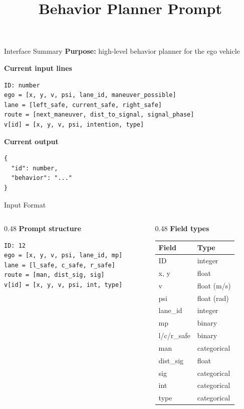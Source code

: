 \documentclass[aspectratio=169]{beamer}
\title{Behavior Planner Prompt}
\author{}
\date{}
\begin{document}
\begin{frame}
    \titlepage
\end{frame}

\begin{frame}[fragile]{Interface Summary}
\textbf{Purpose:} high-level behavior planner for the ego vehicle

\vspace{0.4em}
\textbf{Current input lines}
\begin{lstlisting}[style=codestyle]
ID: number
ego = [x, y, v, psi, lane_id, maneuver_possible]
lane = [left_safe, current_safe, right_safe]
route = [next_maneuver, dist_to_signal, signal_phase]
v[id] = [x, y, v, psi, intention, type]
\end{lstlisting}

\textbf{Current output}
\begin{lstlisting}[style=codestyle]
{
  "id": number,
  "behavior": "..."
}
\end{lstlisting}
\end{frame}

\begin{frame}[fragile]{Input Format}
\begin{columns}[T]
    \begin{column}{0.48\textwidth}
        \textbf{Prompt structure}
        \begin{lstlisting}[style=codestyle]
ID: 12
ego = [x, y, v, psi, lane_id, mp]
lane = [l_safe, c_safe, r_safe]
route = [man, dist_sig, sig]
v[id] = [x, y, v, psi, int, type]
        \end{lstlisting}
    \end{column}
    \begin{column}{0.48\textwidth}
        \textbf{Field types}
        \begin{tabular}{>{\ttfamily}p{}p{}}
            \toprule
            Field & Type \\
            \midrule
            ID & integer \\
            x, y & float \\
            v & float (m/s) \\
            psi & float (rad) \\
            lane\_id & integer \\
            mp & binary \\
            l/c/r\_safe & binary \\
            man & categorical \\
            dist\_sig & float \\
            sig & categorical \\
            int & categorical \\
            type & categorical \\
            \bottomrule
        \end{tabular}
    \end{column}
\end{columns}
\end{frame}
\end{document}
